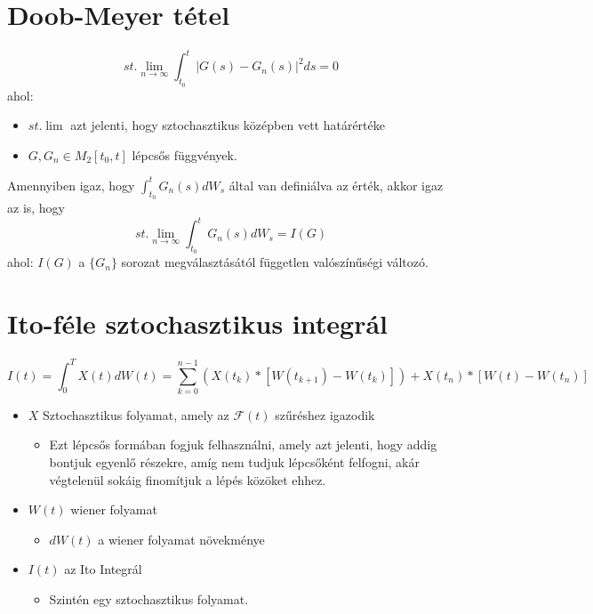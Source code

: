 \documentclass[11pt,a4paper]{article}
\begin{document}
				\section{Doob-Meyer tétel}
					\paragraph{}
						$${st.\lim_{n \to \infty}} \int_{t_0}^t | G(s) - G_n(s)|^2ds = 0$$
						ahol:
						\begin{itemize}
						\item ${st. \lim}$ azt jelenti, hogy sztochasztikus középben vett határértéke
						\item $G, G_n \in M_2[t_0,t]$ lépcsős függvények.
						\end{itemize}
						Amennyiben igaz, hogy $\int_{t_0}^t G_n(s) dW_s$ által van definiálva az érték, akkor igaz az is, hogy
						$${st. \lim_{n \to \infty}} \int_{t_0}^t G_n(s) dW_s = I(G)$$
						ahol: $I(G)$ a $\{G_n\}$ sorozat megválasztásától független valószínűségi változó.
			\section{Ito-féle sztochasztikus integrál}
				\paragraph{}
					$$I(t) = \int_0^T X(t) dW(t) = \sum_{k=0}^{n-1}(X(t_k)*[W(t_{k+1}) - W(t_k)]) + X(t_n)*[W(t)-W(t_n)]$$
					\begin{itemize}
						\item $X$ Sztochasztikus folyamat, amely az $\mathcal{F}(t)$ szűréshez igazodik
						\begin{itemize}
							\item Ezt lépcsős formában fogjuk felhasználni, amely azt jelenti, hogy addig bontjuk egyenlő részekre, amíg nem tudjuk lépcsőként felfogni, akár végtelenül sokáig finomítjuk a lépés közöket ehhez.
						\end{itemize}
						\item $W(t)$ wiener folyamat
						\begin{itemize}
							\item $dW(t)$ a wiener folyamat növekménye
						\end{itemize}
						\item $I(t)$ az Ito Integrál
						\begin{itemize}
							\item Szintén egy sztochasztikus folyamat.
						\end{itemize}
					\end{itemize}
\end{document}
